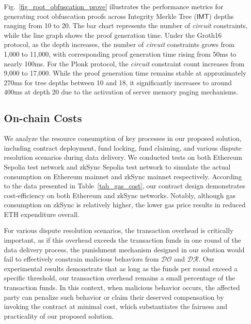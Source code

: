 \documentclass[journal]{IEEEtran}
\begin{document}
Fig.~\ref{fig_root_obfuscation_prove} illustrates the performance metrics for generating root obfuscation proofs across Integrity Merkle Tree ($\mathsf{IMT}$) depths ranging from 10 to 20. The bar chart represents the number of \emph{circuit} constraints, while the line graph shows the proof generation time. Under the Groth16 protocol, as the depth increases, the number of \emph{circuit} constraints grows from 1,000 to 11,000, with corresponding proof generation time rising from 50ms to nearly 100ms. For the Plonk protocol, the \emph{circuit} constraint count increases from 9,000 to 17,000. While the proof generation time remains stable at approximately 270ms for tree depths between 10 and 18, it significantly increases to around 400ms at depth 20 due to the activation of server memory paging mechanisms. 

\subsection{On-chain Costs}
We analyze the resource consumption of key processes in our proposed solution, including contract deployment, fund locking, fund claiming, and various dispute resolution scenarios during data delivery. We conducted tests on both Ethereum Sepolia test network and zkSync Sepolia test network to simulate the actual consumption on Ethereum mainnet and zkSync mainnet respectively. According to the data presented in Table~\ref{tab_gas_cost}, our contract design demonstrates cost-efficiency on both Ethereum and zkSync networks. Notably, although gas consumption on zkSync is relatively higher, the lower gas price results in reduced ETH expenditure overall.

For various dispute resolution scenarios, the transaction overhead is critically important, as if this overhead exceeds the transaction funds in one round of the data delivery process, the punishment mechanism designed in our solution would fail to effectively constrain malicious behaviors from $\mathcal{DO}$ and $\mathcal{DR}$. Our experimental results demonstrate that as long as the funds per round exceed a specific threshold, our transaction overhead remains a small percentage of the transaction funds. In this context, when malicious behavior occurs, the affected party can penalize such behavior or claim their deserved compensation by invoking the contract at minimal cost, which substantiates the fairness and practicality of our proposed solution.
\end{document}
